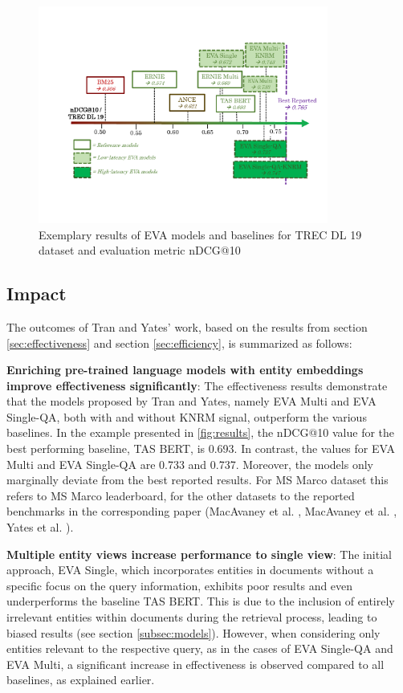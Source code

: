 \begin{figure}[!htb]
    \centering
    \includegraphics[trim={1.5cm 3cm 0.7cm 3cm}, clip, width=0.85\textwidth]{resources/results} 
    \caption{Exemplary results of EVA models and baselines for TREC DL 19 dataset and evaluation metric nDCG@10}
    \label{fig:results}
\end{figure}

\subsection{Impact}\label{subsec:outcomes}

The outcomes of Tran and Yates' work, based on the results from section \ref{sec:effectiveness} and section \ref{sec:efficiency}, is summarized as follows:

\textbf{Enriching pre-trained language models with entity embeddings improve effectiveness significantly}:
The effectiveness results demonstrate that the models proposed by Tran and Yates, namely EVA Multi and EVA Single-QA, both with and without KNRM signal, outperform the various baselines. In the example presented in \autoref{fig:results}, the nDCG@10 value for the best performing baseline, TAS BERT, is 0.693. In contrast, the values for EVA Multi and EVA Single-QA are 0.733 and 0.737. Moreover, the models only marginally deviate from the best reported results. For MS Marco dataset this refers to MS Marco leaderboard, for the other datasets to the reported benchmarks in the corresponding paper (MacAvaney et al. \cite{trec_dl_2019}, MacAvaney et al. \cite{trec_dl_2020}, Yates et al. \cite{dl_hard}).

\textbf{Multiple entity views increase performance to single view}:
The initial approach, EVA Single, which incorporates entities in documents without a specific focus on the query information, exhibits poor results and even underperforms the baseline TAS BERT. This is due to the inclusion of entirely irrelevant entities within documents during the retrieval process, leading to biased results (see section \ref{subsec:models}). However, when considering only entities relevant to the respective query, as in the cases of EVA Single-QA and EVA Multi, a significant increase in effectiveness is observed compared to all baselines, as explained earlier.


